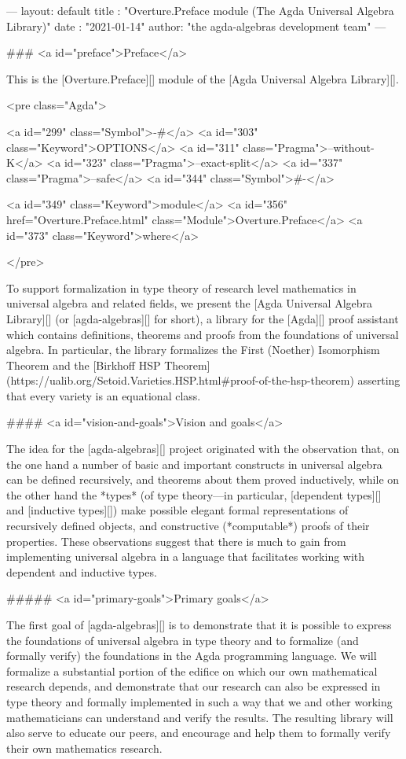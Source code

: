 ---
layout: default
title : "Overture.Preface module (The Agda Universal Algebra Library)"
date : "2021-01-14"
author: "the agda-algebras development team"
---

### <a id="preface">Preface</a>

This is the [Overture.Preface][] module of the [Agda Universal Algebra Library][].

<pre class="Agda">

<a id="299" class="Symbol">{-#</a> <a id="303" class="Keyword">OPTIONS</a> <a id="311" class="Pragma">--without-K</a> <a id="323" class="Pragma">--exact-split</a> <a id="337" class="Pragma">--safe</a> <a id="344" class="Symbol">#-}</a>

<a id="349" class="Keyword">module</a> <a id="356" href="Overture.Preface.html" class="Module">Overture.Preface</a> <a id="373" class="Keyword">where</a>

</pre>

To support formalization in type theory of research level mathematics in universal
algebra and related fields, we present the [Agda Universal Algebra
Library][] (or [agda-algebras][] for short), a library for
the [Agda][] proof assistant which contains definitions, theorems and proofs from
the foundations of universal algebra. In particular, the library formalizes the
First (Noether) Isomorphism Theorem and the [Birkhoff HSP
Theorem](https://ualib.org/Setoid.Varieties.HSP.html#proof-of-the-hsp-theorem)
asserting that every variety is an equational class.

#### <a id="vision-and-goals">Vision and goals</a>

The idea for the [agda-algebras][] project originated with the observation that,
on the one hand a number of basic and important constructs in universal algebra
can be defined recursively, and theorems about them proved inductively, while on
the other hand the *types*
(of type theory---in particular, [dependent types][] and [inductive types][])
make possible elegant formal representations of recursively defined objects, and
constructive (*computable*) proofs of their properties. These observations suggest
that there is much to gain from implementing universal algebra in a language that
facilitates working with dependent and inductive types.

##### <a id="primary-goals">Primary goals</a>

The first goal of [agda-algebras][] is to demonstrate that it is possible to
express the foundations of universal algebra in type theory and to formalize (and
formally verify) the foundations in the Agda programming language. We will
formalize a substantial portion of the edifice on which our own mathematical
research depends, and demonstrate that our research can also be expressed in type
theory and formally implemented in such a way that we and other working
mathematicians can understand and verify the results. The resulting library will
also serve to educate our peers, and encourage and help them to formally verify
their own mathematics research.


